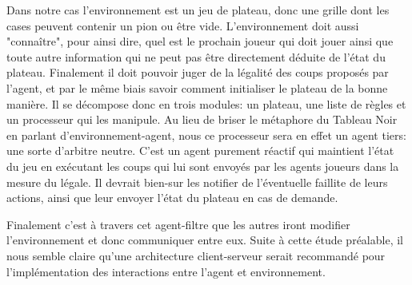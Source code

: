 Dans notre cas l'environnement est un jeu de plateau, donc une grille dont les cases peuvent contenir un pion ou être vide. L'environnement doit aussi "connaître", pour ainsi dire, quel est le prochain joueur qui doit jouer ainsi que toute autre information qui ne peut pas être directement déduite de l'état du plateau. Finalement il doit pouvoir juger de la légalité des coups proposés par l'agent, et par le même biais savoir comment initialiser le plateau de la bonne manière.
Il se décompose donc en trois modules: un plateau, une liste de règles et un processeur qui les manipule. Au lieu de briser le métaphore du \og Tableau Noir \fg{} en parlant d'environnement-agent, nous ce processeur sera en effet un agent tiers: une sorte d'arbitre neutre. C'est un agent purement réactif qui maintient l'état du jeu en exécutant les coups qui lui sont envoyés par les agents joueurs dans la mesure du légale. Il devrait bien-sur les notifier de l'éventuelle faillite de leurs actions, ainsi que leur envoyer l'état du plateau en cas de demande. 


Finalement c'est à travers cet agent-filtre que les autres iront modifier l'environnement et donc communiquer entre eux. Suite à cette étude préalable, il nous semble claire qu'une architecture client-serveur serait recommandé pour l'implémentation des interactions entre l'agent et environnement.